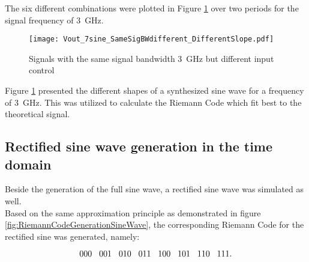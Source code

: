 The six different combinations were plotted in Figure \ref{fig:SameSigBWDifSlope} over two periods for the signal frequency of \SI{3}{\GHz}. 

\begin{figure}[htb!]
	\centering
  \texttt{[image: Vout\_7sine\_SameSigBWdifferent\_DifferentSlope.pdf]}
	\caption{Signals with the same signal bandwidth \SI{3}{\giga \hertz} but different input control}
	\label{fig:SameSigBWDifSlope}
\end{figure}

Figure \ref{fig:SameSigBWDifSlope} presented the different shapes of a synthesized sine wave for a frequency of \SI{3}{\GHz}.
This was utilized to calculate the Riemann Code which fit best to the theoretical signal.


\subsection{Rectified sine wave generation in the time domain}
Beside the generation of the full sine wave, a rectified sine wave was simulated as well.\\
Based on the same approximation principle as demonstrated in figure \ref{fig:RiemannCodeGenerationSineWave}, the corresponding Riemann Code for the rectified sine was generated, namely:



\begin{equation}
 000\hspace{.3cm} 001\hspace{.3cm} 010\hspace{.3cm} 011\hspace{.3cm} 100\hspace{.3cm} 101\hspace{.3cm} 110\hspace{.3cm} 111.
\end{equation}
\label{eq:RiemannCodeRectSine}

